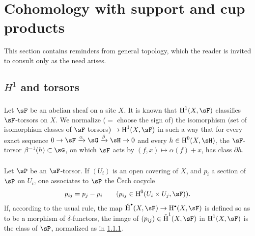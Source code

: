 \section{Cohomology with support and cup products}\label{IV:1}

This section contains reminders from general topology, which the reader is
invited to consult only as the need arises.










\subsection{\texorpdfstring{$H^1$}{H1} and torsors}\label{IV:1-1}






\subsubsection{}\label{IV:1-1-1}

Let $\sF$ be an abelian sheaf on a site $X$. It is known that
$\h^1(X,\sF)$ classifies $\sF$-torsors on $X$. We normalize ($=$ choose the
sign of) the isomorphism $($set of isomorphism classes of
$\sF$-torsors$)\to \h^1(X,\sF)$ in such a way that for every exact sequence
$0\to \sF\xrightarrow\alpha\sG\xrightarrow\beta\sH\to 0$ and every
$h\in\h^0(X,\sH)$, the $\sF$-torsor $\beta^{-1}(h)\subset \sG$, on which
$\sF$ acts by $(f,x)\mapsto \alpha(f)+x$, has class $\partial h$.






\subsubsection{}\label{IV:1-1-2}

Let $\sP$ be an $\sF$-torsor. If $(U_i)$ is an open covering of $X$, and
$p_i$ a section of $\sP$ on $U_i$, one associates to $\sP$ the \v{C}ech
cocycle
\[
  p_{i j} = p_j - p_i \qquad \text{($p_{i j}\in \h^0(U_i\times U_j,\sF)$).}
\]
If, according to the usual rule, the map
$\operatorname{\check H}^\bullet(X,\sF)\to \h^\bullet(X,\sF)$ is defined so
as to be a morphism of $\delta$-functors, the image of
$(p_{i j})\in \operatorname{\check H}^1(X,\sF)$ in $\h^1(X,\sF)$ is the class
of $\sP$, normalized as in \ref{IV:1-1-1}.






